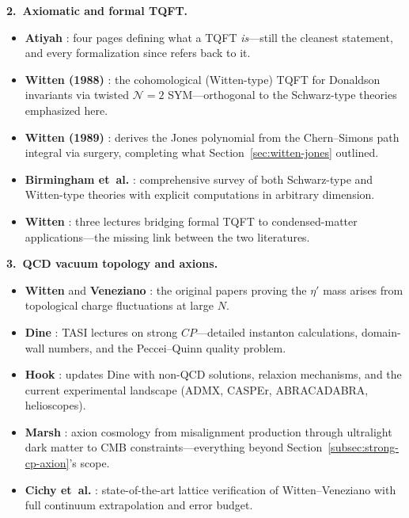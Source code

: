 \medskip
\noindent\textbf{2.\ Axiomatic and formal TQFT.}
\begin{itemize}
\item \textbf{Atiyah} \cite{Atiyah1988TQFT}: four pages defining what a TQFT \emph{is}---still the cleanest statement, and every formalization since refers back to it.
\item \textbf{Witten (1988)} \cite{Witten1988TQFT}: the cohomological (Witten-type) TQFT for Donaldson invariants via twisted $\mathcal{N}=2$ SYM---orthogonal to the Schwarz-type theories emphasized here.
\item \textbf{Witten (1989)} \cite{Witten1989Jones}: derives the Jones polynomial from the Chern--Simons path integral via surgery, completing what Section~\ref{sec:witten-jones} outlined.
\item \textbf{Birmingham et~al.} \cite{BirminghamBlauRakowskiThompson1991TopologicalFieldTheory}: comprehensive survey of both Schwarz-type and Witten-type theories with explicit computations in arbitrary dimension.
\item \textbf{Witten} \cite{Witten2016ThreeLecturesTopologicalPhases}: three lectures bridging formal TQFT to condensed-matter applications---the missing link between the two literatures.
\end{itemize}

\medskip
\noindent\textbf{3.\ QCD vacuum topology and axions.}
\begin{itemize}
\item \textbf{Witten} \cite{Witten1979U1GoldstoneBoson} and \textbf{Veneziano} \cite{Veneziano1979U1WithoutInstantons}: the original papers proving the $\eta'$ mass arises from topological charge fluctuations at large $N$.
\item \textbf{Dine} \cite{Dine2000TASIStrongCP}: TASI lectures on strong $CP$---detailed instanton calculations, domain-wall numbers, and the Peccei--Quinn quality problem.
\item \textbf{Hook} \cite{Hook2018TASIStrongCPAxions}: updates Dine with non-QCD solutions, relaxion mechanisms, and the current experimental landscape (ADMX, CASPEr, ABRACADABRA, helioscopes).
\item \textbf{Marsh} \cite{Marsh2016AxionCosmology}: axion cosmology from misalignment production through ultralight dark matter to CMB constraints---everything beyond Section~\ref{subsec:strong-cp-axion}'s scope.
\item \textbf{Cichy et~al.} \cite{CichyLatticeWittenVeneziano}: state-of-the-art lattice verification of Witten--Veneziano with full continuum extrapolation and error budget.
\end{itemize}


